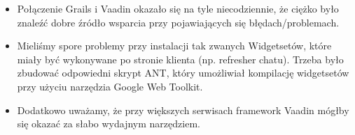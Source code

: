 \begin{itemize}
\item Połączenie Grails i Vaadin okazało się na tyle niecodziennie, że ciężko było znaleźć dobre źródło wsparcia przy pojawiających się błędach/problemach.
\item Mieliśmy spore problemy przy instalacji tak zwanych Widgetsetów, które miały być wykonywane po stronie klienta (np. refresher chatu). Trzeba było zbudować odpowiedni skrypt ANT, który umożliwiał kompilację widgetsetów przy użyciu narzędzia Google Web Toolkit. 
\item Dodatkowo uważamy, że przy większych serwisach framework Vaadin mógłby się okazać za słabo wydajnym narzędziem.
\end{itemize}